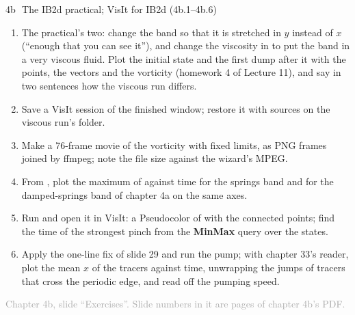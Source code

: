 \documentclass[aspectratio=169,11pt]{beamer}
\newcommand{\sourcecredit}[1]{\vfill\begin{flushright}\tiny\textcolor{DarkGray}{#1}\end{flushright}}
\providecommand{\gui}[1]{\textsf{\textbf{#1}}}
\begin{document}
\begin{frame}{4b\,\textbullet\ The IB2d practical; VisIt for IB2d (4b.1--4b.6)}
\label{fr:c4bx1}
\small
\begin{enumerate}
  \item[4b.1] The practical's two: change the band so that it is stretched in $y$ instead of $x$ (``enough that you can see it''), and change the viscosity in  to put the band in a very viscous fluid. Plot the initial state and the first dump after it with the points, the vectors and the vorticity (homework 4 of Lecture 11), and say in two sentences how the viscous run differs.
  \item[4b.2] Save a VisIt session of the finished window; restore it with sources on the viscous run's folder.
  \item[4b.3] Make a 76-frame movie of the vorticity with fixed limits, as PNG frames joined by ffmpeg; note the file size against the wizard's MPEG.
  \item[4b.4] From , plot the maximum of  against time for the springs band and for the damped-springs band of chapter 4a on the same axes.
  \item[4b.5] Run  and open it in VisIt: a Pseudocolor of  with the connected points; find the time of the strongest pinch from the \gui{MinMax} query over the states.
  \item[4b.6] Apply the one-line fix of slide 29 and run the pump; with chapter 33's reader, plot the mean $x$ of the tracers against time, unwrapping the jumps of tracers that cross the periodic edge, and read off the pumping speed.
\end{enumerate}
\sourcecredit{Chapter 4b, slide ``Exercises''. Slide numbers in it are pages of chapter 4b's PDF.}
\end{frame}
\end{document}
